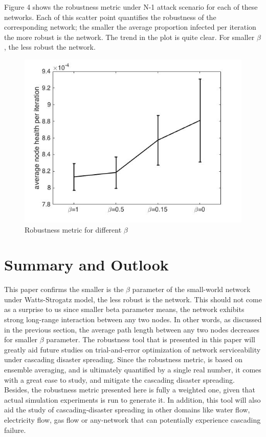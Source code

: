 \documentclass[11pt]{article}
\begin{document}
Figure 4 shows the robustness metric under N-1 attack scenario for each of these networks. Each of this scatter point quantifies the robustness of the corresponding network; the smaller the average proportion infected per iteration the more robust is the network. The trend in the plot is quite clear. For smaller $\beta$, the less robust the network. 

\begin{figure}[t!]
\centering
\includegraphics[width=0.70\columnwidth]{images/periteration.jpg}
\caption{Robustness metric for different $\beta$}
\end{figure}
\clearpage

\section{Summary and Outlook}
This paper confirms the smaller is the $\beta$ parameter of the small-world network under Watts-Strogatz model, the less robust is the network. This should not come as a surprise to us since smaller beta parameter means, the network exhibits strong long-range interaction between any two nodes. In other words, as discussed in the previous section, the average path length between any two nodes decreases for smaller $\beta$ parameter. The robustness tool that is presented in this paper will greatly aid future studies on trial-and-error optimization of network serviceability under cascading disaster spreading. Since the robustness metric, is based on ensemble averaging, and is ultimately quantified by a single real number, it comes with a great ease to study, and mitigate the cascading disaster spreading. Besides, the robustness metric presented here is fully a weighted one, given that actual simulation experiments is run to generate it. In addition, this tool will also aid the study of cascading-disaster spreading in other domains like water flow, electricity flow, gas flow or any-network that can potentially experience cascading failure.
\end{document}
